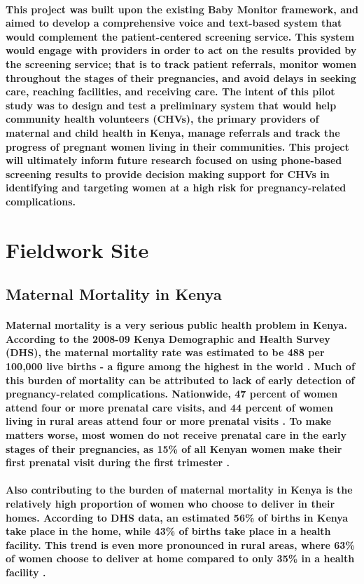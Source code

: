 \paragraph{This project was built upon the existing Baby Monitor framework, and aimed to develop a comprehensive voice and text-based system that would complement the patient-centered screening service. This system would engage with providers in order to act on the results provided by the screening service; that is to track patient referrals, monitor women throughout the stages of their pregnancies, and avoid delays in seeking care, reaching facilities, and receiving care. The intent of this pilot study was to design and test a preliminary system that would help community health volunteers (CHVs), the primary providers of maternal and child health in Kenya, manage referrals and track the progress of pregnant women living in their communities. This project will ultimately inform future research focused on using phone-based screening results to provide decision making support for CHVs in identifying and targeting women at a high risk for pregnancy-related complications.}

\section{Fieldwork Site}
\subsection{Maternal Mortality in Kenya}
\paragraph{Maternal mortality is a very serious public health problem in Kenya. According to the 2008-09 Kenya Demographic and Health Survey (DHS), the maternal mortality rate was estimated to be 488 per 100,000 live births - a figure among the highest in the world \citep{DHS2010}. Much of this burden of mortality can be attributed to lack of early detection of pregnancy-related complications. Nationwide, 47 percent of women attend four or more prenatal care visits, and 44 percent of women living in rural areas attend four or more prenatal visits \citep{DHS2010}. To make matters worse, most women do not receive prenatal care in the early stages of their pregnancies, as 15\% of all Kenyan women make their first prenatal visit during the first trimester \citep{DHS2010}.}

\paragraph{Also contributing to the burden of maternal mortality in Kenya is the relatively high proportion of women who choose to deliver in their homes. According to DHS data, an estimated 56\% of births in Kenya take place in the home, while 43\% of births take place in a health facility. This trend is even more pronounced in rural areas, where 63\% of women choose to deliver at home compared to only 35\% in a health facility \citep{DHS2010}.}

